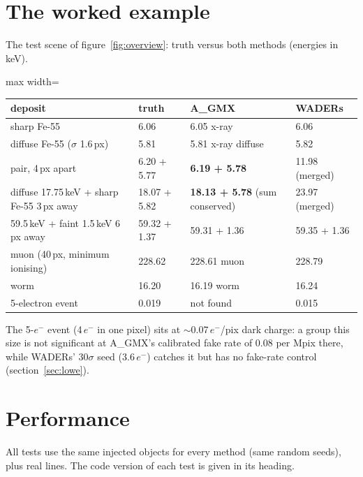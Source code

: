 \documentclass[11pt,a4paper]{article}
\newcommand{\el}{\ensuremath{e^-}}
\newcommand{\AGMX}{A\_GMX}
\begin{document}
\section{The worked example}

The test scene of figure~\ref{fig:overview}: truth versus both methods (energies in keV).

\begin{table}[H]\centering\small
\begin{adjustbox}{max width=\linewidth}
\begin{tabular}{llll}
\toprule
deposit & truth & \AGMX & WADERs \\
\midrule
sharp Fe-55 & 6.06 & 6.05 x-ray & 6.06 \\
diffuse Fe-55 ($\sigma$ 1.6\,px) & 5.81 & 5.81 x-ray diffuse & 5.82 \\
pair, 4\,px apart & 6.20 + 5.77 & \textbf{6.19 + 5.78} & 11.98 (merged) \\
diffuse 17.75\,keV + sharp Fe-55 3\,px away & 18.07 + 5.82 & \textbf{18.13 + 5.78} (sum conserved) & 23.97 (merged) \\
59.5\,keV + faint 1.5\,keV 6\,px away & 59.32 + 1.37 & 59.31 + 1.36 & 59.35 + 1.36 \\
muon (40\,px, minimum ionising) & 228.62 & 228.61 muon & 228.79 \\
worm & 16.20 & 16.19 worm & 16.24 \\
5-electron event & 0.019 & not found & 0.015 \\
\bottomrule
\end{tabular}
\end{adjustbox}
\end{table}

The 5-\el{} event (4\,\el{} in one pixel) sits at $\sim$0.07\,\el/pix dark charge: a group this size is not significant at
\AGMX's calibrated fake rate of 0.08 per Mpix there, while WADERs' 30$\sigma$ seed (3.6\,\el) catches it but has no
fake-rate control (section~\ref{sec:lowe}).

\section{Performance}\label{sec:perf}

All tests use the same injected objects for every method (same random seeds), plus real lines. The code version of each
test is given in its heading.
\end{document}
